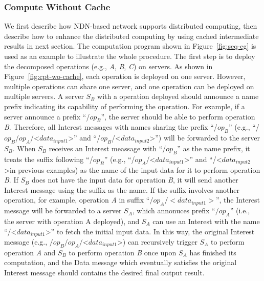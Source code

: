 \documentclass[journal]{IEEEtran}
\begin{document}
\subsubsection{Compute Without Cache}
We first describe how NDN-based network supports distributed computing, then
describe how to enhance the distributed computing by using cached intermediate
results in next section.  The computation program shown in
Figure~\ref{fig:seq-eg} is used as an example to illustrate the whole procedure.
The first step is to deploy the decomposed operations (e.g., {\it A}, {\it B},
{\it C}) on servers.  As shown in Figure~\ref{fig:cpt-wo-cache}, each operation
is deployed on one server. However, multiple operations can share one server,
and one operation can be deployed on multiple servers.  A server $S_B$ with a
operation deployed should announce a name prefix indicating its capability of
performing the operation.  For example, if a server announce a prefix
``/$op_B$'', the server should be able to perform operation {\it B}.  Therefore,
all {\sc Interest} messages with names sharing the prefix ``/$op_B$'' (e.g.,
``/$op_B$/$op_A$/\textless$data_{input1}$\textgreater'' and
``/$op_B$/\textless$data_{input2}$\textgreater'') will be forwarded to the
server $S_B$.  When $S_B$ receives an {\sc Interest} meassage with ``/$op_B$''
as the name prefix, it treats the suffix following ``/$op_B$'' (e.g.,
``/$op_A$/\textless$data_{input1}$\textgreater'' and
``/\textless$data_{input2}$\textgreater in previous examples) as the name of the
input data for it to perform operation {\it B}.  If $S_B$ does not have the
input data for operation {\it B}, it will send another {\sc Interest} message
using the suffix as the name.  If the suffix involves another operation, for
example, operation {\it A} in suffix ``$/op_A/$$<data_{input1}>$'', the {\sc
  Interest} message will be forwarded to a server $S_A$, which annonuces prefix
``$/op_A$'' (i.e., the server with operation A deployed), and $S_A$ can use an
{\sc Interest} with the name ``/\textless$data_{input1}$\textgreater'' to fetch
the initial input data.  In this way, the original {\sc Interest} message (e.g.,
$/op_B/op_A/$\textless$data_{input1}$\textgreater) can recursively trigger $S_A$
to perform operation {\it A} and $S_B$ to perform operation {\it B} once upon
$S_A$ has finished its computation, and the {\sc Data} message which eventually
satisfies the original {\sc Interest} message should contains the desired final
output result.
\end{document}
